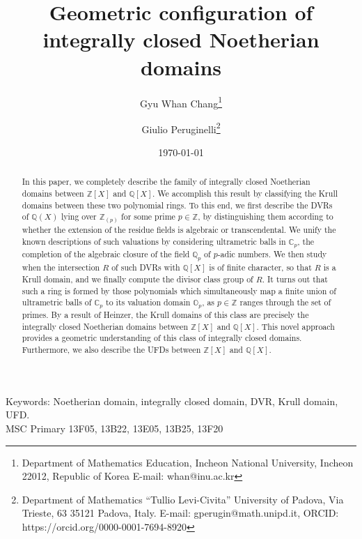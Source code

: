 \documentclass[10pt]{article}
\title{Geometric configuration of integrally closed Noetherian domains}
\date{\today}
\author{Gyu Whan Chang\footnote{Department of Mathematics Education, Incheon National University, Incheon 22012, Republic of Korea E-mail: whan@inu.ac.kr} \and Giulio Peruginelli\footnote{Department of Mathematics ``Tullio Levi-Civita'' University of Padova, Via Trieste, 63 35121 Padova, Italy. E-mail: gperugin@math.unipd.it, ORCID: https://orcid.org/0000-0001-7694-8920}}
\numberwithin{equation}{section}
\theoremstyle{definition}
\theoremstyle{definition}
\newcommand{\Q}{\mathbb{Q}}
\newcommand{\Z}{\mathbb{Z}}
\newcommand{\C}{\mathbb{C}}
\renewcommand{\O}{\mathbb{O}}
\begin{document}
\maketitle



\begin{abstract}
In this paper, we completely describe the family of integrally closed Noetherian domains between $\Z[X]$ and $\Q[X]$. We accomplish this result by classifying the Krull domains between these two polynomial rings. To this end, we first describe the
DVRs of $\mathbb{Q}(X)$ lying over $\mathbb{Z}_{(p)}$ for some prime $p \in \Z$, by  distinguishing them according to whether the extension of the residue fields is algebraic or transcendental. We unify the known descriptions of such valuations by considering ultrametric balls in $\C_p$, the completion of the algebraic closure of the field $\Q_p$ of $p$-adic numbers.
We then study when the intersection $R$ of such DVRs with $\Q[X]$ is of finite character, so that 
$R$ is a Krull domain, and we finally compute the divisor class group of $R$. It turns out that such a ring is formed by those polynomials which simultaneously  map a finite union of ultrametric balls of $\C_p$ to its valuation domain $\O_p$, as $p\in\Z$ ranges through the set of primes. 
By a result of Heinzer, the Krull domains of this class are precisely the integrally closed Noetherian domains between $\Z[X]$ and $\Q[X]$. This novel approach provides a geometric understanding of this class of integrally closed domains. Furthermore, we also describe the UFDs between $\Z[X]$ and $\Q[X]$.
\end{abstract}
\medskip

{\small \noindent Keywords: Noetherian domain, integrally closed domain, DVR, Krull domain, UFD.\\
\medskip
\noindent MSC Primary  13F05, 13B22, 13E05, 13B25, 13F20\\}
\end{document}
